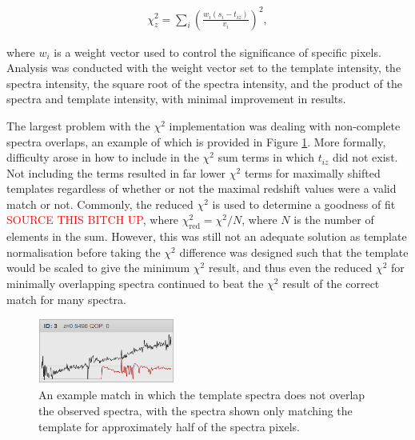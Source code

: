 \documentclass[titlesmallcaps, examinerscopy, copyrightpage]{uqthesis}
\newcommand{\brac}[1]{\left( #1 \right)}
\begin{document}
\begin{align}
\chi^2_z = \sum\limits_i \brac{\frac{w_i\brac{s_i - t_{iz}}}{v_i}}^2,
\end{align}

where $w_i$ is a weight vector used to control the significance of specific pixels. Analysis was conducted with the weight vector set to the template intensity, the spectra intensity, the square root of the spectra intensity, and the product of the spectra and template intensity, with minimal improvement in results.

The largest problem with the $\chi^2$ implementation was dealing with non-complete spectra overlaps, an example of which is provided in Figure \ref{fig:overlap}. More formally, difficulty arose in how to include in the $\chi^2$ sum terms in which $t_{iz}$ did not exist. Not including the terms resulted in far lower $\chi^2$ terms for maximally shifted templates regardless of whether or not the maximal redshift values were a valid match or not. Commonly, the reduced $\chi^2$ is used to determine a goodness of fit \textcolor{red}{SOURCE THIS BITCH UP}, where $\chi_{\text{red}}^2 = \chi^2 / N$, where $N$ is the number of elements in the sum. However, this was still not an adequate solution as template normalisation before taking the $\chi^2$ difference was designed such that the template would be scaled to give the minimum $\chi^2$ result, and thus even the reduced $\chi^2$ for minimally overlapping spectra continued to beat the $\chi^2$ result of the correct match for many spectra.

\begin{figure}[ht!]
\includegraphics[width=0.4\textwidth]{images/overlap.png} 
\centering
\caption{An example match in which the template spectra does not overlap the observed spectra, with the spectra shown only matching the template for approximately half of the spectra pixels.}
\label{fig:overlap}
\end{figure}
\end{document}

